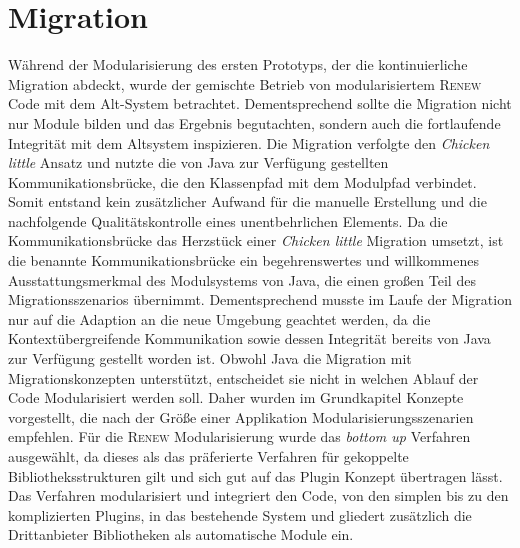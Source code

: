 \section{Migration}
Während der Modularisierung des ersten Prototyps, der die kontinuierliche Migration abdeckt, wurde der gemischte Betrieb von modularisiertem \textsc{Renew} Code mit dem Alt-System betrachtet. Dementsprechend sollte die Migration nicht nur Module bilden und das Ergebnis begutachten, sondern auch die fortlaufende Integrität mit dem Altsystem inspizieren.\newline
Die Migration verfolgte den \textit{Chicken little} Ansatz und nutzte die von Java zur Verfügung gestellten Kommunikationsbrücke, die den Klassenpfad mit dem Modulpfad verbindet. Somit entstand kein zusätzlicher Aufwand für die manuelle Erstellung und die nachfolgende Qualitätskontrolle eines unentbehrlichen Elements. Da die Kommunikationsbrücke das Herzstück einer \textit{Chicken little} Migration umsetzt, ist die benannte Kommunikationsbrücke ein begehrenswertes und willkommenes Ausstattungsmerkmal des Modulsystems von Java, die einen großen Teil des Migrationsszenarios übernimmt. Dementsprechend musste im Laufe der Migration nur auf die Adaption an die neue Umgebung geachtet werden, da die Kontextübergreifende Kommunikation sowie dessen Integrität bereits von Java zur Verfügung gestellt worden ist. \newline
Obwohl Java die Migration mit Migrationskonzepten unterstützt, entscheidet sie nicht in welchen Ablauf der Code Modularisiert werden soll. Daher wurden im Grundkapitel Konzepte vorgestellt, die nach der Größe einer Applikation Modularisierungsszenarien empfehlen. Für die \textsc{Renew} Modularisierung wurde das \textit{bottom up} Verfahren ausgewählt, da dieses als das präferierte Verfahren für gekoppelte Bibliotheksstrukturen gilt und sich gut auf das Plugin Konzept übertragen lässt. Das Verfahren modularisiert und integriert den Code, von den simplen bis zu den komplizierten Plugins, in das bestehende System und gliedert zusätzlich die Drittanbieter Bibliotheken als automatische Module ein.\bigbreak

